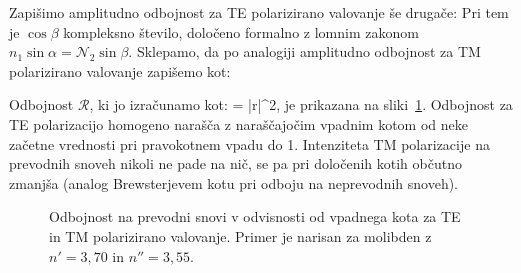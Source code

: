 Zapišimo amplitudno odbojnost za TE polarizirano valovanje še drugače:
Pri tem je $\cos \beta$ kompleksno število, določeno formalno 
z lomnim zakonom $n_1 \sin \alpha = \mathcal{N}_2 \sin \beta$.
Sklepamo, da po analogiji amplitudno odbojnost za TM polarizirano valovanje zapišemo kot: 


Odbojnost $\mathcal{R}$, ki jo izračunamo kot:
\beq
{} = |r|^2,
\label{eq:04_100a}
\eeq
je prikazana na sliki~\ref{fig:04_kovina}. Odbojnost za TE polarizacijo
homogeno narašča z naraščajočim vpadnim kotom 
od neke začetne vrednosti pri pravokotnem vpadu do 1. 
Intenziteta TM polarizacije na prevodnih snoveh 
nikoli ne pade na nič, se pa pri določenih kotih občutno
zmanjša (analog Brewsterjevem kotu pri odboju na neprevodnih snoveh).
\begin{figure}[ht]
\centering
\def\svgwidth{70truemm} 

\caption{Odbojnost na prevodni snovi v odvisnosti od vpadnega kota za TE in TM polarizirano
valovanje. Primer je narisan za molibden z $n'=3,70$ in $n''=3,55$.}
\label{fig:04_kovina}
\end{figure}

